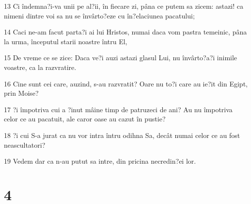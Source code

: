 \par 13 Ci îndemna?i-va unii pe al?ii, în fiecare zi, pâna ce putem sa zicem: astazi! ca nimeni dintre voi sa nu se învârto?eze cu în?elaciunea pacatului;
\par 14 Caci ne-am facut parta?i ai lui Hristos, numai daca vom pastra temeinic, pâna la urma, începutul starii noastre întru El,
\par 15 De vreme ce se zice: Daca ve?i auzi astazi glasul Lui, nu învârto?a?i inimile voastre, ca la razvratire.
\par 16 Cine sunt cei care, auzind, s-au razvratit? Oare nu to?i care au ie?it din Egipt, prin Moise?
\par 17 ?i împotriva cui a ?inut mâine timp de patruzeci de ani? Au nu împotriva celor ce au pacatuit, ale caror oase au cazut în pustie?
\par 18 ?i cui S-a jurat ca nu vor intra întru odihna Sa, decât numai celor ce au fost neascultatori?
\par 19 Vedem dar ca n-au putut sa intre, din pricina necredin?ei lor.

\chapter{4}

